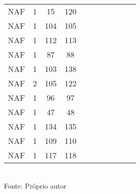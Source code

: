 \begin{table}[H]
{\begin{tabular}{ccccccccccc}
NAF & 1 & 15 & 120 &  &  &  &  &  &  &  \\
NAF & 1 & 104 & 105 &  &  &  &  &  &  &  \\
NAF & 1 & 112 & 113 &  &  &  &  &  &  &  \\
NAF & 1 & 87 & 88 &  &  &  &  &  &  &  \\
NAF & 1 & 103 & 138 &  &  &  &  &  &  &  \\
NAF & 2 & 105 & 122 &  &  &  &  &  &  &  \\
NAF & 1 & 96 & 97 &  &  &  &  &  &  &  \\
NAF & 1 & 47 & 48 &  &  &  &  &  &  &  \\
NAF & 1 & 134 & 135 &  &  &  &  &  &  &  \\
NAF & 1 & 109 & 110 &  &  &  &  &  &  &  \\
NAF & 1 & 117 & 118 &  &  &  &  &  &  &  \\
\bottomrule
\end{tabular}}
\\Fonte: Próprio autor
\end{table}



